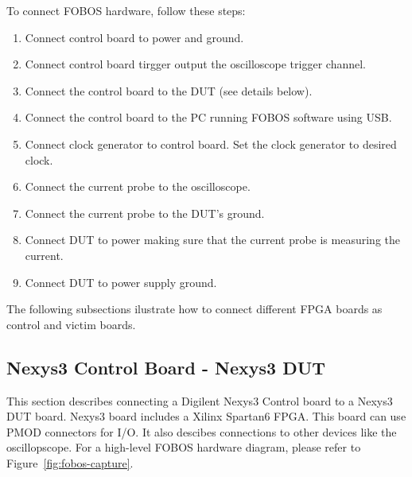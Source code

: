 To connect FOBOS hardware, follow these steps:
  \begin{enumerate}
  \item Connect control board to power and ground.
  \item Connect control board tirgger output the oscilloscope trigger channel.
  \item Connect the control board to the DUT (see details below).
  \item Connect the control board to the PC running FOBOS software using USB.
  \item Connect clock generator to control board. Set the clock generator to desired clock.
  \item Connect the current probe to the oscilloscope.
  \item Connect the current probe to the DUT's ground.
  \item Connect DUT to power making sure that the current probe is measuring the current.
  \item Connect DUT to power supply ground.
  \end{enumerate}
  
The following subsections ilustrate how to connect different FPGA boards as control and victim boards.

\subsection{Nexys3 Control Board - Nexys3 DUT}

This section describes connecting a Digilent Nexys3 Control board to a Nexys3 DUT board.
Nexys3 board includes a Xilinx Spartan6 FPGA. This board can use PMOD connectors for I/O.
It also descibes connections to other devices like the oscillopscope. For a high-level FOBOS hardware diagram, please refer to Figure~\ref{fig:fobos-capture}.


